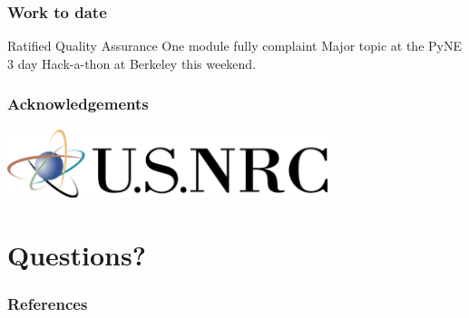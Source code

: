 \documentclass[12pt]{beamer}
\begin{document}
\begin{frame}
\frametitle{Work to date}

Ratified Quality Assurance
One module fully complaint
Major topic at the PyNE 3 day Hack-a-thon at Berkeley this weekend.

\end{frame}


\begin{frame}[fragile]
\frametitle{Acknowledgements}

\includegraphics[height=2cm]{figures/NRClogo.png} \\

\end{frame}


\section*{Questions?}

\begin{frame}[plain]
        \tiny
        \frametitle{References}
        
        \color{black}
        
\end{frame}

\end{document}
